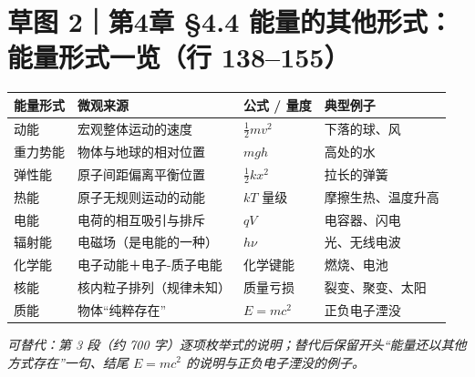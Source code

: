 \documentclass[UTF8,11pt]{ctexart}
\begin{document}
\section*{草图 2｜第4章 §4.4 能量的其他形式：能量形式一览（行 138--155）}
\vspace{2mm}
\begin{center}
\small
\begin{tabular}{@{}p{2.2cm}p{5.4cm}p{4.2cm}p{3.1cm}@{}}
\toprule
能量形式 & 微观来源 & 公式 / 量度 & 典型例子 \\
\midrule
动能     & 宏观整体运动的速度        & $\frac12 mv^2$ & 下落的球、风 \\
重力势能 & 物体与地球的相对位置      & $mgh$           & 高处的水 \\
弹性能   & 原子间距偏离平衡位置      & $\frac12 kx^2$ & 拉长的弹簧 \\
热能     & 原子无规则运动的动能      & $kT$ 量级       & 摩擦生热、温度升高 \\
电能     & 电荷的相互吸引与排斥      & $qV$            & 电容器、闪电 \\
辐射能   & 电磁场（是电能的一种）    & $h\nu$          & 光、无线电波 \\
化学能   & 电子动能＋电子-质子电能   & 化学键能        & 燃烧、电池 \\
核能     & 核内粒子排列（规律未知）  & 质量亏损        & 裂变、聚变、太阳 \\
质能     & 物体“纯粹存在”          & $E=mc^2$        & 正负电子湮没 \\
\bottomrule
\end{tabular}

\vspace{4mm}
\end{center}
\emph{可替代：第 3 段（约 700 字）逐项枚举式的说明；替代后保留开头“能量还以其他方式存在”一句、结尾 $E=mc^2$ 的说明与正负电子湮没的例子。}

\newpage
\end{document}
